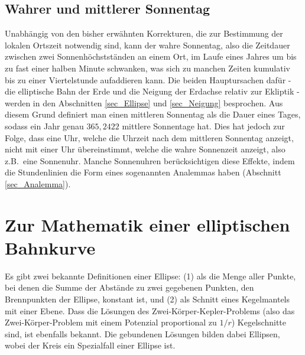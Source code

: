 \subsection{Wahrer und mittlerer Sonnentag}
\label{sec_wahrerSonnentag}

Unabh\"angig von den bisher erw\"ahnten Korrekturen, die zur Bestimmung der lokalen
Ortszeit notwendig sind, kann der wahre Sonnentag, also die Zeitdauer zwischen zwei 
Sonnenh\"ochstst\"anden an einem Ort, im Laufe eines Jahres um bis zu fast einer halben Minute
schwanken, was sich zu manchen Zeiten kumulativ bis zu einer Viertelstunde aufaddieren kann. 
Die beiden Hauptursachen daf\"ur - die elliptische Bahn der Erde und die Neigung der Erdachse 
relativ zur Ekliptik - werden in den Abschnitten \ref{sec_Ellipse} und \ref{sec_Neigung} besprochen. 
Aus diesem Grund definiert man einen mittleren Sonnentag 
als die Dauer eines Tages, sodass ein Jahr
genau $365,2422$ mittlere Sonnentage hat. Dies hat jedoch zur Folge, dass eine
Uhr, welche die Uhrzeit nach dem mittleren Sonnentag anzeigt, nicht mit einer Uhr \"ubereinstimmt,
welche die wahre Sonnenzeit anzeigt, also z.B.\ eine Sonnenuhr. 
Manche Sonnenuhren
ber\"ucksichtigen diese Effekte, indem die Stundenlinien die Form eines sogenannten
Analemmas haben (Abschnitt \ref{sec_Analemma}).

\section{Zur Mathematik einer elliptischen Bahnkurve}

Es gibt zwei bekannte Definitionen einer Ellipse: 
(1) als die Menge aller Punkte, bei denen die
Summe der Abst\"ande zu zwei gegebenen Punkten, den Brennpunkten der Ellipse, konstant ist, 
und (2) als Schnitt
eines Kegelmantels mit einer Ebene. Dass die L\"osungen des Zwei-K\"orper-Kepler-Problems
(also das Zwei-K\"orper-Problem mit einem Potenzial proportional zu $1/r$) Kegelschnitte
sind, ist ebenfalls bekannt. Die gebundenen L\"osungen bilden dabei Ellipsen, wobei 
der Kreis ein Spezialfall einer Ellipse ist. 

